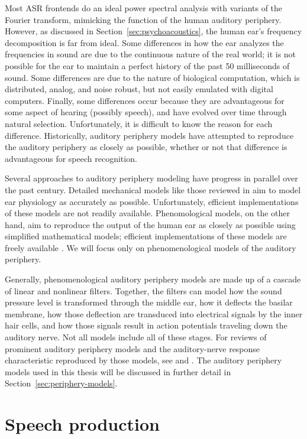 Most ASR frontends do an ideal
power spectral analysis
with variants of the Fourier transform,
mimicking the function
of the human auditory periphery.
However, as discussed in Section~\ref{sec:psychoacoustics},
the human ear's frequency decomposition
is far from ideal.
Some differences in how the ear
analyzes the frequencies in sound
are due to the continuous nature
of the real world;
it is not possible for the ear
to maintain a perfect history
of the past 50 milliseconds of sound.
Some differences are due to
the nature of biological computation,
which is distributed, analog, and noise robust,
but not easily emulated with digital computers.
Finally, some differences
occur because they are advantageous
for some aspect of hearing
(possibly speech),
and have evolved over time through natural selection.
Unfortunately, it is difficult to know
the reason for each difference.
Historically, auditory periphery models
have attempted to reproduce
the auditory periphery as closely as possible,
whether or not that difference is advantageous
for speech recognition.

Several approaches to auditory periphery modeling
have progress in parallel over the past century.
Detailed mechanical models
like those reviewed in \citet{ni2014}
aim to model ear physiology
as accurately as possible.
Unfortunately, efficient implementations
of these models are not readily available.
Phenomological models, on the other hand,
aim to reproduce the output
of the human ear
as closely as possible
using simplified mathematical models;
efficient implementations of these
models are freely available
\citep{fontaine2011}.
We will focus only on phenomenological
models of the auditory periphery.

Generally, phenomenological auditory periphery models
are made up of a cascade of linear and nonlinear filters.
Together, the filters can model
how the sound pressure level
is transformed through the middle ear,
how it deflects the basilar membrane,
how those deflection are transduced
into electrical signals
by the inner hair cells,
and how those signals result in
action potentials traveling down
the auditory nerve.
Not all models include all of these stages.
For reviews of prominent
auditory periphery models and
the auditory-nerve response characteristic
reproduced by those models,
see \citet{lopez2005}
and \citet{lyon2010}.
The auditory periphery models used
in this thesis will be discussed
in further detail in
Section~\ref{sec:periphery-models}.

\section{Speech production}


